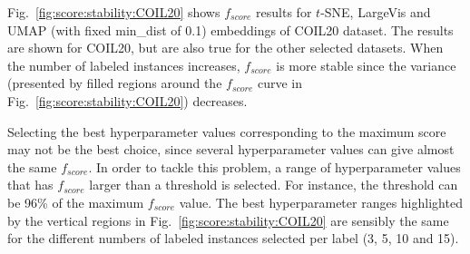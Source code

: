 Fig.~\ref{fig:score:stability:COIL20} shows $f_{score}$ results for $t$-SNE, LargeVis and UMAP (with fixed {min\_dist} of 0.1) embeddings of COIL20 dataset.
The results are shown for COIL20, but are also true for the other selected datasets.
When the number of labeled instances increases, $f_{score}$ is more stable since the variance (presented by filled regions around the $f_{score}$ curve in Fig.~\ref{fig:score:stability:COIL20}) decreases.

Selecting the best hyperparameter values corresponding to the maximum score may not be the best choice, since several hyperparameter values can give almost the same $f_{score}$.
In order to tackle this problem, a range of hyperparameter values that has $f_{score}$ larger than a threshold is selected.
For instance, the threshold can be 96\% of the maximum $f_{score}$ value.
The best hyperparameter ranges highlighted by the vertical regions in Fig.~\ref{fig:score:stability:COIL20} are sensibly the same for the different numbers of labeled instances selected per label (3, 5, 10 and 15).


